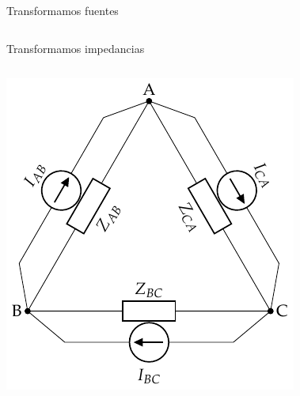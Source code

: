 \documentclass[aspectratio=169, usenames,svgnames,dvipsnames]{beamer}
\begin{document}
\begin{frame}[label={sec:org7efb820}]{Transformamos fuentes}
\begin{columns}
\begin{column}{0.4\columnwidth}
\begin{center}
\end{center}
\end{column}
\end{columns}
\end{frame}

\begin{frame}[label={sec:org10a8534}]{Transformamos impedancias}
\begin{columns}
\begin{column}{0.4\columnwidth}
\begin{center}
\includegraphics[width=\textwidth]{../figs/GeneradorRealTriangulo_I.pdf}
\end{center}
\end{column}


\end{columns}
\end{frame}
\end{document}
